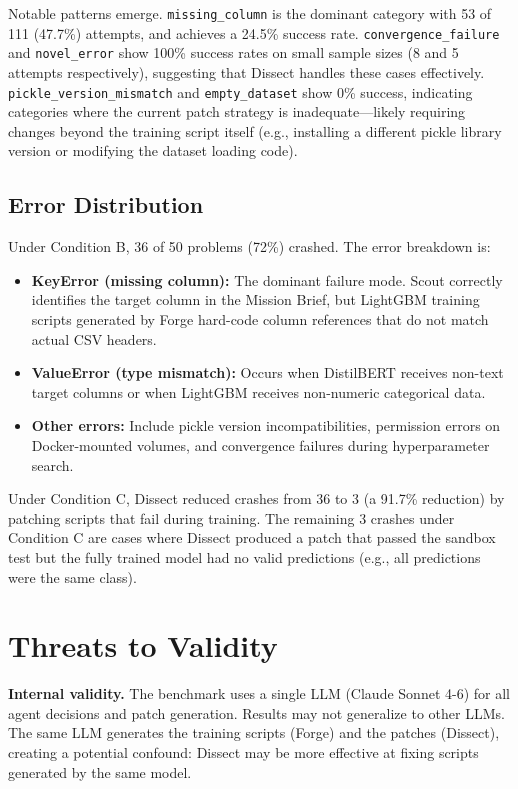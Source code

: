 \documentclass[conference]{IEEEtran}
\begin{document}
Notable patterns emerge. \texttt{missing\_column} is the dominant category with 53 of 111
(47.7\%) attempts, and achieves a 24.5\% success rate. \texttt{convergence\_failure} and
\texttt{novel\_error} show 100\% success rates on small sample sizes (8 and 5 attempts
respectively), suggesting that Dissect handles these cases effectively.
\texttt{pickle\_version\_mismatch} and \texttt{empty\_dataset} show 0\% success,
indicating categories where the current patch strategy is inadequate---likely requiring
changes beyond the training script itself (e.g., installing a different pickle library
version or modifying the dataset loading code).

\subsection{Error Distribution}

Under Condition B, 36 of 50 problems (72\%) crashed. The error breakdown is:

\begin{itemize}
  \item \textbf{KeyError (missing column):} The dominant failure mode. Scout correctly
  identifies the target column in the Mission Brief, but LightGBM training scripts
  generated by Forge hard-code column references that do not match actual CSV headers.

  \item \textbf{ValueError (type mismatch):} Occurs when DistilBERT receives non-text
  target columns or when LightGBM receives non-numeric categorical data.

  \item \textbf{Other errors:} Include pickle version incompatibilities, permission
  errors on Docker-mounted volumes, and convergence failures during hyperparameter
  search.
\end{itemize}

Under Condition C, Dissect reduced crashes from 36 to 3 (a 91.7\% reduction) by patching
scripts that fail during training. The remaining 3 crashes under Condition C are cases
where Dissect produced a patch that passed the sandbox test but the fully trained model
had no valid predictions (e.g., all predictions were the same class).

\section{Threats to Validity}

\textbf{Internal validity.} The benchmark uses a single LLM (Claude Sonnet 4-6) for all
agent decisions and patch generation. Results may not generalize to other LLMs. The same
LLM generates the training scripts (Forge) and the patches (Dissect), creating a
potential confound: Dissect may be more effective at fixing scripts generated by the same
model.
\end{document}
